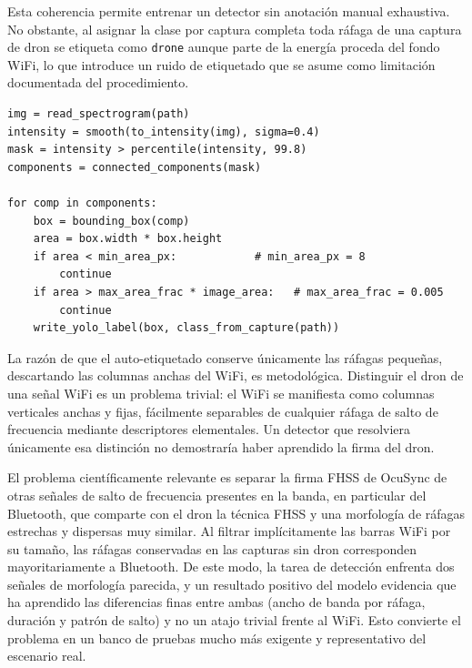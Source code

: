 \vspace{1em}
Esta coherencia permite entrenar un detector sin anotación manual exhaustiva. No obstante, al asignar la clase por captura completa toda ráfaga de una captura de dron se etiqueta como \texttt{drone} aunque parte de la energía proceda del fondo WiFi, lo que introduce un ruido de etiquetado que se asume como limitación documentada del procedimiento.

\begin{lstlisting}[style=python,caption={Pseudocódigo del auto-etiquetado de ráfagas.}]
img = read_spectrogram(path)
intensity = smooth(to_intensity(img), sigma=0.4)
mask = intensity > percentile(intensity, 99.8)
components = connected_components(mask)

for comp in components:
    box = bounding_box(comp)
    area = box.width * box.height
    if area < min_area_px:            # min_area_px = 8
        continue
    if area > max_area_frac * image_area:   # max_area_frac = 0.005
        continue
    write_yolo_label(box, class_from_capture(path))
\end{lstlisting}





La razón de que el auto-etiquetado conserve únicamente las ráfagas pequeñas, descartando las columnas anchas del WiFi, es metodológica. Distinguir el dron de una señal WiFi es un problema trivial: el WiFi se manifiesta como columnas verticales anchas y fijas, fácilmente separables de cualquier ráfaga de salto de frecuencia mediante descriptores elementales. Un detector que resolviera únicamente esa distinción no demostraría haber aprendido la firma del dron.

El problema científicamente relevante es separar la firma FHSS de OcuSync de otras señales de salto de frecuencia presentes en la banda, en particular del Bluetooth, que comparte con el dron la técnica FHSS y una morfología de ráfagas estrechas y dispersas muy similar. Al filtrar implícitamente las barras WiFi por su tamaño, las ráfagas conservadas en las capturas sin dron corresponden mayoritariamente a Bluetooth. De este modo, la tarea de detección enfrenta dos señales de morfología parecida, y un resultado positivo del modelo evidencia que ha aprendido las diferencias finas entre ambas (ancho de banda por ráfaga, duración y patrón de salto) y no un atajo trivial frente al WiFi. Esto convierte el problema en un banco de pruebas mucho más exigente y representativo del escenario real.

